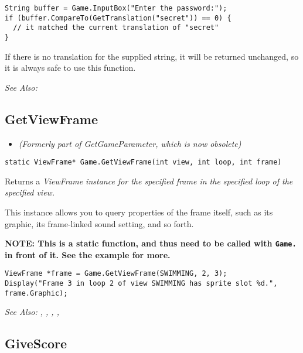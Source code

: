 \begin{verbatim}
String buffer = Game.InputBox("Enter the password:");
if (buffer.CompareTo(GetTranslation("secret")) == 0) {
  // it matched the current translation of "secret"
}
\end{verbatim}
If there is no translation for the supplied string, it will be returned
unchanged, so it is always safe to use this function.

\it{See Also:} 


\subsection{GetViewFrame}\label{Game.GetViewFrame}%

\begin{itemize}
\item \it{(Formerly part of GetGameParameter, which is now obsolete)}
\end{itemize}

\begin{verbatim}
static ViewFrame* Game.GetViewFrame(int view, int loop, int frame)
\end{verbatim}
Returns a \it{ViewFrame} instance for the specified frame in the specified loop of the specified view.

This instance allows you to query properties of the frame itself, such as its graphic, its frame-linked
sound setting, and so forth.

\bf{NOTE:} This is a static function, and thus need to be called with \verb$Game.$ in front of it. See
the example for more.

\begin{verbatim}
ViewFrame *frame = Game.GetViewFrame(SWIMMING, 2, 3);
Display("Frame 3 in loop 2 of view SWIMMING has sprite slot %d.", frame.Graphic);
\end{verbatim}

\it{See Also:} ,
,
,
, 


\subsection{GiveScore}\label{GiveScore}%

